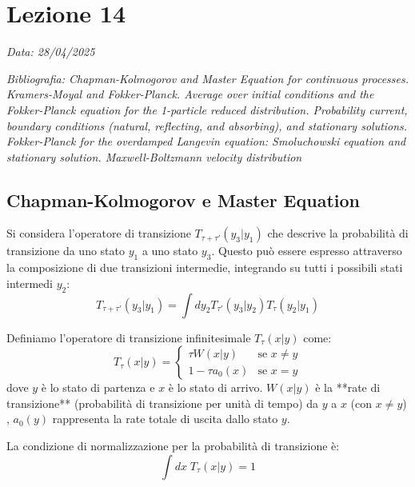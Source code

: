 \chapter{Lezione 14}
\label{chap:lezione_14} %

\begin{flushright}
\textit{Data: 28/04/2025}
\end{flushright}
\textit{Bibliografia: 
Chapman-Kolmogorov and Master Equation for continuous processes. Kramers-Moyal and Fokker-Planck. Average over initial conditions and the Fokker-Planck equation for the 1-particle reduced distribution. Probability current, boundary conditions (natural, reflecting, and absorbing), and stationary solutions. Fokker-Planck for the overdamped Langevin equation: Smoluchowski equation and stationary solution. Maxwell-Boltzmann velocity distribution}

\section{Chapman-Kolmogorov e Master Equation}

Si considera l'operatore di transizione $T_{\tau+ \tau'}(y_3|y_1)$ che descrive la probabilità di transizione da uno stato $y_1$ a uno stato $y_3$. Questo può essere espresso attraverso la composizione di due transizioni intermedie, integrando su tutti i possibili stati intermedi $y_2$:
\begin{equation}
T_{\tau+ \tau'}(y_3|y_1) = \int dy_2 T_{ \tau'}(y_3|y_2) T_{ \tau}(y_2|y_1)  
\end{equation}


Definiamo l'operatore di transizione infinitesimale $T_{\tau}(x|y)$ come:
\begin{equation}
T_{\tau}(x|y) =
\begin{cases}
\tau W(x|y) & \text{se } x \neq y \\
1 - \tau a_0(x) & \text{se } x = y
\end{cases} 
\end{equation}
dove $y$ è lo stato di partenza e $x$ è lo stato di arrivo. $W(x|y)$ è la **rate di transizione** (probabilità di transizione per unità di tempo) da $y$ a $x$ (con $x \neq y$) , $a_0(y)$ rappresenta la rate totale di uscita dallo stato $y$.

La condizione di normalizzazione per la probabilità di transizione è:
\begin{equation}
\int dx \;T_{\tau}(x|y) = 1
\end{equation}


